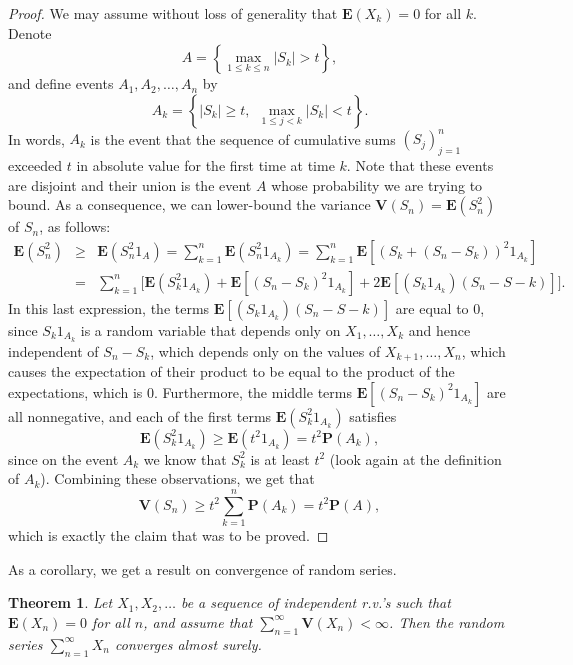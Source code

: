 \documentclass[12pt]{article}
\newtheorem{thm}{Theorem}[section]
\newcommand{\prob}{\mathbf{P}}
\newcommand{\expec}{\mathbf{E}}
\newcommand{\var}{\mathbf{V}}
\theoremstyle{example}
\begin{document}
\begin{proof} We may assume without loss of generality that $\expec(X_k)=0$ for all $k$. Denote 
$$ A = \left\{ \max_{1\le k\le n} |S_k| > t\right\}, $$
and define events $A_1,A_2,\ldots,A_n$ by
$$ A_k = \left\{ |S_k|\ge t, \ \ \max_{1\le j<k} |S_k|<t \right\}. $$
In words, $A_k$ is the event that the sequence of cumulative sums $(S_j)_{j=1}^n$ exceeded $t$ in absolute value for the first time at time $k$. Note that these events are disjoint and their union is the event $A$ whose probability we are trying to bound. As a consequence, we can lower-bound the variance $\var(S_n)=\expec(S_n^2)$ of $S_n$, as follows:
\begin{eqnarray*}
\expec(S_n^2) &\ge& \expec(S_n^2 1_A) = \sum_{k=1}^n \expec \left(S_n^2 1_{A_k}\right)
= \sum_{k=1}^n \expec \left[ \left(S_k+(S_n-S_k)\right)^2 1_{A_k} \right]
\\ &=&
\sum_{k=1}^n \Big[\expec (S_k^2 1_{A_k}) + \expec\left[ (S_n-S_k)^2 1_{A_k} \right]
+ 2 \expec \left[(S_k 1_{A_k}) (S_n-S-k) \right] \Big].
\end{eqnarray*}
In this last expression, the terms $\expec \left[(S_k 1_{A_k}) (S_n-S-k) \right]$ are equal to $0$, since $S_k 1_{A_k}$ is a random variable that depends only on $X_1,\ldots,X_k$ and hence independent of $S_n-S_k$, which depends only on the values of $X_{k+1},\ldots,X_n$, which causes the expectation of their product to be equal to the product of the expectations, which is 0. Furthermore, the middle terms $\expec\left[ (S_n-S_k)^2 1_{A_k} \right]$ are all nonnegative, and each of the first terms $\expec (S_k^2 1_{A_k})$ satisfies
$$ \expec (S_k^2 1_{A_k}) \ge \expec (t^2 1_{A_k}) = t^2 \prob(A_k), $$
since on the event $A_k$ we know that $S_k^2$ is at least $t^2$ (look again at the definition of $A_k$). Combining these observations, we get that
$$ \var(S_n)  \ge t^2\sum_{k=1}^n \prob(A_k) = t^2 \prob(A), $$
which is exactly the claim that was to be proved.
\end{proof}

As a corollary, we get a result on convergence of random series.

\begin{thm} Let $X_1,X_2,\ldots$ be a sequence of independent r.v.'s such that $\expec(X_n)=0$ for all $n$, and assume that $\sum_{n=1}^\infty \var(X_n) < \infty$. Then the random series $\sum_{n=1}^\infty X_n$ converges almost surely.
\label{thm-one-series}
\end{thm}
\end{document}
